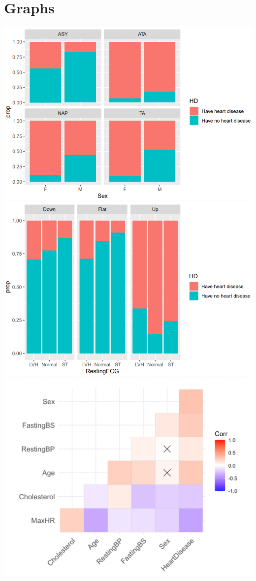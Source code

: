 \documentclass[a0paper,fleqn]{betterposter}
\begin{document}
{\section{Graphs}
\includegraphics[length=10cm]{directSex.png}
\includegraphics[length=10cm]{directRestingECG.png}
\includegraphics[length=10cm]{cor.png}
\begin{center}


\end{center}}
\end{document}
